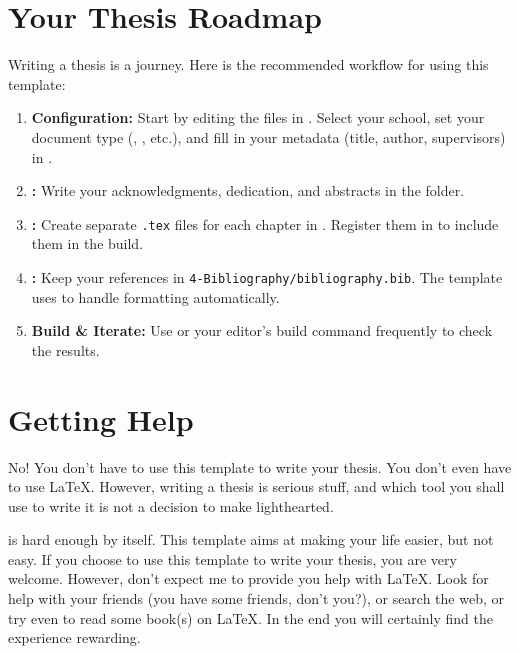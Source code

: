 \section{Your Thesis Roadmap}
\label{sec:roadmap}

Writing a thesis is a journey. Here is the recommended workflow for using this template:

\begin{enumerate}
  \item \textbf{Configuration:} Start by editing the files in . Select your school, set your document type (, , etc.), and fill in your metadata (title, author, supervisors) in .
  \item \textbf{:} Write your acknowledgments, dedication, and abstracts in the  folder.
  \item \textbf{:} Create separate \texttt{.tex} files for each chapter in . Register them in  to include them in the build.
  \item \textbf{:} Keep your references in \texttt{4-Bibliography/bibliography.bib}. The template uses  to handle formatting automatically.
  \item \textbf{Build \& Iterate:} Use  or your editor's build command frequently to check the results.
\end{enumerate}


\section{Getting Help}
\label{sec:getting_help}

\ntindex[help]{}

No! You don't have to use this template to write your thesis.  You don't even have to use \LaTeX.  However, writing a thesis is serious stuff, and which tool you shall use to write it is not a decision to make lighthearted.

 is hard enough by itself.  This template aims at making your life easier, but not easy. If you choose to use this template to write your thesis, you are very welcome.  However, don't expect me to provide you help with \LaTeX.  Look for help with your friends (you have some friends, don't you?), or search the web, or try even to read some book(s) on \LaTeX. In the end you will certainly find the experience rewarding.

